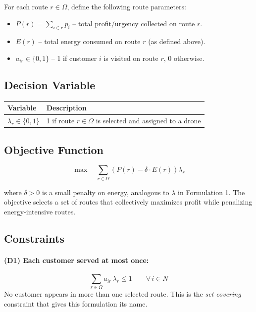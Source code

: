 \documentclass[12pt,a4paper]{article}
\begin{document}
\noindent For each route $r \in \Omega$, define the following route parameters:
\begin{itemize}
  \item $P(r) = \sum_{i \in r} p_i$ \quad -- total profit/urgency collected on route $r$.
  \item $E(r)$ \quad -- total energy consumed on route $r$ (as defined above).
  \item $a_{ir} \in \{0,1\}$ \quad -- 1 if customer $i$ is visited on route $r$, 0
  otherwise.
\end{itemize}

\subsection{Decision Variable}

\begin{center}
\begin{tabular}{ll}
\toprule
Variable & Description \\
\midrule
$\lambda_r \in \{0,1\}$ & 1 if route $r \in \Omega$ is selected and assigned to a drone \\
\bottomrule
\end{tabular}
\end{center}

\subsection{Objective Function}

\begin{equation}
  \max \quad \sum_{r \in \Omega} \left( P(r) - \delta \cdot E(r) \right) \lambda_r
  \tag{F2-Obj}
\end{equation}

where $\delta > 0$ is a small penalty on energy, analogous to $\lambda$ in Formulation 1.
The objective selects a set of routes that collectively maximizes profit while penalizing
energy-intensive routes.

\subsection{Constraints}

\paragraph{(D1) Each customer served at most once:}
\begin{equation}
  \sum_{r \in \Omega} a_{ir} \, \lambda_r \leq 1
  \qquad \forall\, i \in N
  \tag{D1}
\end{equation}
No customer appears in more than one selected route. This is the \emph{set covering}
constraint that gives this formulation its name.
\end{document}

